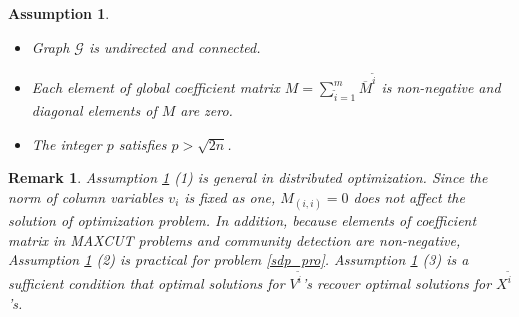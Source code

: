 \documentclass[journal]{IEEEtran}
\newtheorem{remark}{Remark}[section]
\newtheorem{assumption}{Assumption}[section]
\begin{document}
\begin{assumption}\label{pro_assump}
	\begin{itemize}
		\item[(1)] Graph $\mathcal G$ is undirected and connected.
		\item[(2)] Each element of global coefficient matrix $M=\sum_{\tilde{i}=1}^m \overline{M}^{\tilde{i}}$ is non-negative and  diagonal elements of $M$ are zero.
		\item[(3)] The integer $p$  satisfies $p>\sqrt{2n}$.
	\end{itemize}
\end{assumption}
\begin{remark}
	Assumption \ref{pro_assump} (1) is general in distributed optimization.
	Since the norm of column variables $v_i$ is fixed as one,  $M_{(i,i)}=0$ does not affect the solution of optimization problem. In addition,  because elements of coefficient matrix  in MAXCUT problems and community detection are non-negative, 
	Assumption \ref{pro_assump} (2) is  practical for   problem \eqref{sdp_pro}.  Assumption \ref{pro_assump} (3) is a sufficient condition that optimal solutions for $V^{\tilde{i}}$'s recover optimal solutions for $X^{\tilde{i}}$'s.
\end{remark}
\end{document}
